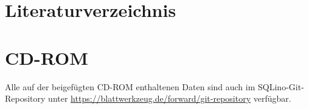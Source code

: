 \documentclass[paper=a4,fontsize=12pt,parskip=half]{scrartcl}
\title{\doctitle}
\subtitle{\docsubtitle}
\author{\docauthors}
\begin{document}


\cleardoublepage



\cleardoublepage

\tableofcontents{}

\cleardoublepage


\cleardoublepage


\cleardoublepage


\cleardoublepage


\cleardoublepage


\cleardoublepage


\appendix{}

\cleardoublepage



\cleardoublepage

\section{Literaturverzeichnis}
\printbibliography[heading=none]

\cleardoublepage
\section{CD-ROM}

Alle auf der beigefügten CD-ROM enthaltenen Daten sind auch im
SQLino-Git-Repository unter
\url{https://blattwerkzeug.de/forward/git-repository} verfügbar.
\end{document}
